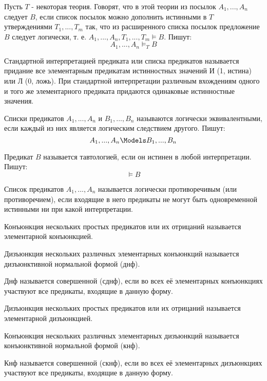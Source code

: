\opred

Пусть $T$ - некоторая теория.
Говорят, что в этой теории из посылок $A_1, ..., A_n$ следует $B$, если список посылок можно дополнить истинными в $T$ утверждениями $T_1, ..., T_m$ так, что из расширенного списка посылок предложение $B$ следует логически, т. е. $A_1, ..., A_n, T_1, ..., T_m \models B$.
Пишут: $$A_1, ..., A_n \models_T B$$

\opred
Стандартной интерпретацией предиката или списка предикатов называется придание все элементарным предикатам истинностных значений И (1, истина) или Л (0, ложь).
При стандартной интерпретации различным вхождениям одного и того же элементарного предиката придаются одинаковые истинностные значения.

\opred
Списки предикатов $A_1, ..., A_n$ и $B_1, ..., B_n$ называются логически эквивалентными, если каждый из них является логическим следствием другого.
Пишут:
$$A_1, ..., A_n \Models B_1, ..., B_n$$

\opred
Предикат $B$ называется тавтологией, если он истинен в любой интерпретации.
Пишут:
$$\models B$$

\opred

Список предикатов $A_1, ..., A_n$ называется логически противоречивым (или противоречием), если входящие в него предикаты не могут быть одновременной истинными ни при какой интерпретации.

\opred

Конъюнкция нескольких простых предикатов или их отрицаний называется элементарной конъюнкцией.

\opred

Дизъюнкция нескольких различных элементарных конъюнкций называется дизъюнктивной нормальной формой (днф).

\opred

Днф называется совершенной (сднф), если во всех её элементарных конъюнкциях участвуют все предикаты, входящие в данную форму.

\opred

Дизъюнкция нескольких простых предикатов или их отрицаний называется элементарной дизъюнкцией.

\opred

Конъюнкция нескольких различных элементарных дизъюнкций называется конъюнктивной нормальной формой (кнф).

\opred

Кнф называется совершенной (скнф), если во всех её элементарных дизъюнкциях участвуют все предикаты, входящие в данную форму.

